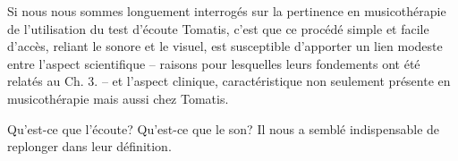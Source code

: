 
Si nous nous sommes longuement interrogés sur la pertinence en musicothérapie de l'utilisation du test 
d'écoute Tomatis, c'est que ce procédé simple et facile d'accès, reliant le sonore et le visuel, est 
susceptible d'apporter un lien modeste entre l'aspect scientifique -- raisons pour lesquelles leurs 
fondements ont été relatés au Ch. 3.  -- et l'aspect clinique, caractéristique  non seulement présente 
en musicothérapie mais aussi chez Tomatis.

 Qu'est-ce que l'écoute?  Qu'est-ce que le son?
 Il nous a semblé indispensable de replonger dans leur définition.



